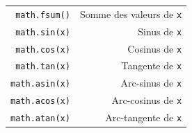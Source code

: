 \documentclass[12pt,]{book}
\numberwithin{equation}{section}
\numberwithin{countremarque}{section}
\begin{document}
\begin{longtable}[]{@{}rr@{}}
\begin{minipage}[t]{0.21\columnwidth}\raggedleft\strut
\texttt{math.fsum()}\strut
\end{minipage} & \begin{minipage}[t]{0.60\columnwidth}\raggedleft\strut
Somme des valeurs de \texttt{x}\strut
\end{minipage}\tabularnewline
\begin{minipage}[t]{0.21\columnwidth}\raggedleft\strut
\texttt{math.sin(x)}\strut
\end{minipage} & \begin{minipage}[t]{0.60\columnwidth}\raggedleft\strut
Sinus de \texttt{x}\strut
\end{minipage}\tabularnewline
\begin{minipage}[t]{0.21\columnwidth}\raggedleft\strut
\texttt{math.cos(x)}\strut
\end{minipage} & \begin{minipage}[t]{0.60\columnwidth}\raggedleft\strut
Cosinus de \texttt{x}\strut
\end{minipage}\tabularnewline
\begin{minipage}[t]{0.21\columnwidth}\raggedleft\strut
\texttt{math.tan(x)}\strut
\end{minipage} & \begin{minipage}[t]{0.60\columnwidth}\raggedleft\strut
Tangente de \texttt{x}\strut
\end{minipage}\tabularnewline
\begin{minipage}[t]{0.21\columnwidth}\raggedleft\strut
\texttt{math.asin(x)}\strut
\end{minipage} & \begin{minipage}[t]{0.60\columnwidth}\raggedleft\strut
Arc-sinus de \texttt{x}\strut
\end{minipage}\tabularnewline
\begin{minipage}[t]{0.21\columnwidth}\raggedleft\strut
\texttt{math.acos(x)}\strut
\end{minipage} & \begin{minipage}[t]{0.60\columnwidth}\raggedleft\strut
Arc-cosinus de \texttt{x}\strut
\end{minipage}\tabularnewline
\begin{minipage}[t]{0.21\columnwidth}\raggedleft\strut
\texttt{math.atan(x)}\strut
\end{minipage} & \begin{minipage}[t]{0.60\columnwidth}\raggedleft\strut
Arc-tangente de \texttt{x}\strut
\end{minipage}\tabularnewline

\end{longtable}
\end{document}
